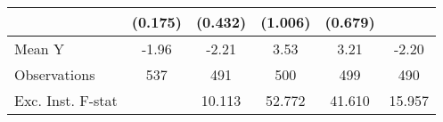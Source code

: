 {\begin{tabular}{l*{5}{c}}
            &     (0.175)         &     (0.432)         &     (1.006)         &     (0.679)         &                     \\
\midrule
Mean Y      &       -1.96         &       -2.21         &        3.53         &        3.21         &       -2.20         \\
Observations&         537         &         491         &         500         &         499         &         490         \\
Exc. Inst. F-stat&                     &      10.113         &      52.772         &      41.610         &      15.957         \\
\bottomrule
\end{tabular}
}
